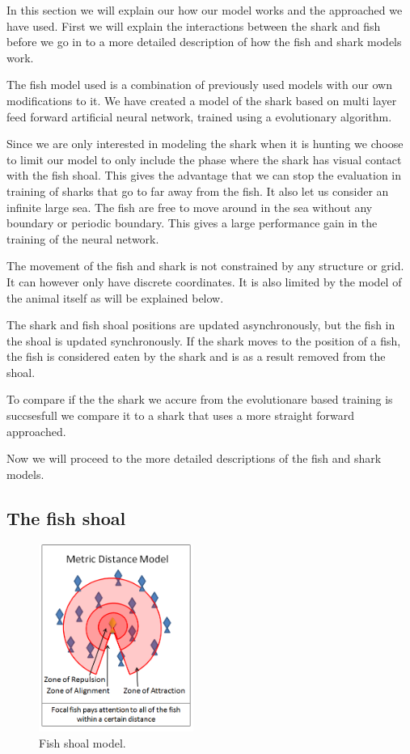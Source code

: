 In this section we will explain our how our model works and the approached we have used. First we will explain the interactions between the shark and fish before we go in to a more detailed description of how the fish and shark models work.

The fish model used is a combination of previously used models with our own modifications to it. We have created a model of the shark based on multi layer feed forward artificial neural network, trained using a evolutionary  algorithm.

Since we are only interested in modeling the shark when it is hunting we choose to limit our model to only include the phase where the shark has visual contact with the fish shoal. This gives the advantage that we can stop the evaluation in training of sharks that go to far away from the fish. It also let us consider an infinite large sea. The fish are free to move around in the sea without any boundary or periodic boundary. This gives a large performance gain in the training of the neural network.

The movement of the fish and shark is not constrained by any structure or grid. It can however only have discrete coordinates. It is also limited by the model of the animal itself as will be explained below.

The shark and fish shoal positions are updated asynchronously, but the fish in the shoal is updated synchronously. If the shark moves to the position of a fish, the fish is considered eaten by the shark and is as a result removed from the shoal.

To compare if the the shark we accure from the evolutionare based training is succsesfull we compare it to a shark that uses a more straight forward approached.

Now we will proceed to the more detailed descriptions of the fish and shark models.

\subsection{The fish shoal}

\begin{figure}
\centering
\includegraphics[width=0.45\textwidth]{figs/swarmfig.png}
\caption{\label{fig:swarm} Fish shoal model.}
\end{figure}

